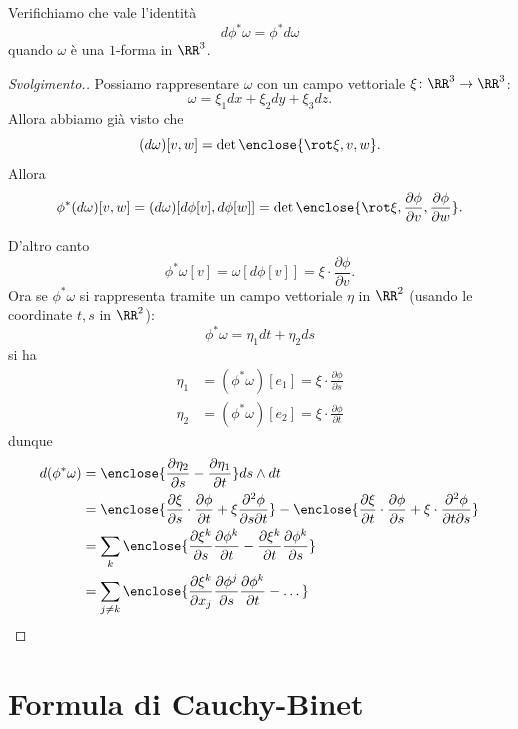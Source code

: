 \begin{exercise}
Verifichiamo che vale l'identità
\[
  d \phi^* \omega = \phi^* d\omega
\]
quando $\omega$ è una $1$-forma in $\RR^3$.
\end{exercise}

\begin{proof}[Svolgimento.]
Possiamo rappresentare $\omega$ con un campo vettoriale $\xi\colon \RR^3\to \RR^3$:
\[
\omega = \xi_1 dx + \xi_2 dy + \xi_3 dz.
\]
Allora abbiamo già visto che 
\[
  (d\omega)[v,w] = \det \enclose{\rot \xi, v, w}.
\]
Allora 
\[
\phi^*(d\omega)[v,w] = (d\omega)[d\phi[v],d\phi[w]]
 = \det \enclose{\rot \xi, \frac{\partial \phi}{\partial v}, \frac {\partial \phi}{\partial w}}.
\]

D'altro canto
\[
 \phi^* \omega [v] 
 = \omega[d\phi[v]] 
 = \xi \cdot \frac{\partial \phi}{\partial v}.
\]
Ora se $\phi^* \omega$ si rappresenta tramite un 
campo vettoriale $\eta$ in $\RR^2$ (usando le coordinate $t,s$ in $\RR^2$):
\[
  \phi^* \omega = \eta_1 dt + \eta_2 ds
\]
si ha 
\begin{align*}
 \eta_1 &= (\phi^*\omega)[e_1] 
 = \xi \cdot \frac{\partial \phi}{\partial s}\\
 \eta_2 &= (\phi^*\omega)[e_2]
 = \xi \cdot \frac{\partial \phi}{\partial t}
\end{align*}
dunque
\begin{align*}
d(\phi^* \omega) 
 &= \enclose{\frac{\partial \eta_2}{\partial s} - \frac{\partial \eta_1}{\partial t}} ds \wedge dt\\
 &= \enclose{\frac{\partial \xi}{\partial s}\cdot \frac{\partial \phi}{\partial t}
  + \xi \frac{\partial^2 \phi}{\partial s \partial t}}
  - \enclose{\frac{\partial \xi}{\partial t}\cdot \frac{\partial \phi}{\partial s}
  + \xi \cdot \frac{\partial^2 \phi}{\partial t\partial s}
  }\\
  &= \sum_k \enclose{
    \frac{\partial \xi^k}{\partial s} \frac{\partial \phi^k}{\partial t}
    - \frac{\partial \xi^k}{\partial t} \frac{\partial \phi^k}{\partial s}
  }\\
  &= \sum_{j\neq k} \enclose{
    \frac{\partial \xi^k}{\partial x_j} \frac{\partial \phi^j}{\partial s} \frac{\partial \phi^k}{\partial t}
    - \dots
  }
\end{align*}


\end{proof}


\section{Formula di Cauchy-Binet}


